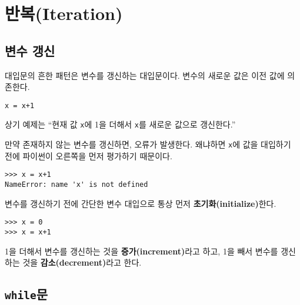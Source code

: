 
\chapter{반복(Iteration)}

\section{  변수 갱신}
\label{update}


대입문의 흔한 패턴은 변수를 갱신하는 대입문이다. 
변수의 새로운 값은 이전 값에 의존한다.

\beforeverb
\begin{verbatim}
x = x+1
\end{verbatim}
\afterverb
%

상기 예제는 ``현재 값 {\tt x}에 1을 더해서 {\tt x}를 새로운 값으로 갱신한다.''

만약 존재하지 않는 변수를 갱신하면, 오류가 발생한다. 
왜냐하면 {\tt x}에 값을 대입하기 전에 파이썬이 오른쪽을 먼저 평가하기 때문이다.

\beforeverb
\begin{verbatim}
>>> x = x+1
NameError: name 'x' is not defined
\end{verbatim}
\afterverb
%

변수를 갱신하기 전에 간단한 변수 대입으로 통상 먼저 {\bf 초기화(initialize)}한다.


\beforeverb
\begin{verbatim}
>>> x = 0
>>> x = x+1
\end{verbatim}
\afterverb
%
1을 더해서 변수를 갱신하는 것을 {\bf 증가(increment)}라고 하고, 
1을 빼서 변수를 갱신하는 것을 {\bf 감소(decrement)}라고 한다.


\section{  {\tt while}문}


